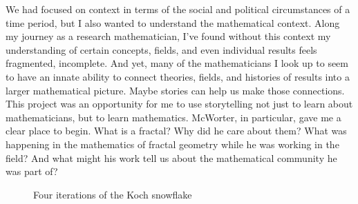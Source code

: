 \documentclass[pdflatex,sn-mathphys-num]{sn-jnl}%
\begin{document}
We had focused on context in terms of the social and political circumstances of a time period, but I also wanted to understand the mathematical context. %
Along my journey as a research mathematician, I've found without this context my understanding of certain concepts, fields, and even individual results feels fragmented, incomplete. And yet, many of the mathematicians I look up to seem to have an innate ability to connect theories, fields, and histories of results into a larger mathematical picture. Maybe stories can help us make those connections. This project was an opportunity for me to use storytelling not just to learn about mathematicians, but to learn mathematics. McWorter, in particular, gave me a clear place to begin. What is a fractal? Why did he care about them? What was happening in the mathematics of fractal geometry while he was working in the field? And what might his work tell us about the mathematical community he was part of?

\bigskip

\noindent\hdashrule{\linewidth}{0.5pt}{2pt 2pt}

\bigskip

\begin{figure}[htpb]
\begin{center}

\hspace{0.5cm}
%
\hspace{0.5cm}
%
\hspace{0.5cm}
%
\end{center}
\caption{Four iterations of the Koch snowflake}
\label{fig:koch_fractal}
\end{figure}
\end{document}
